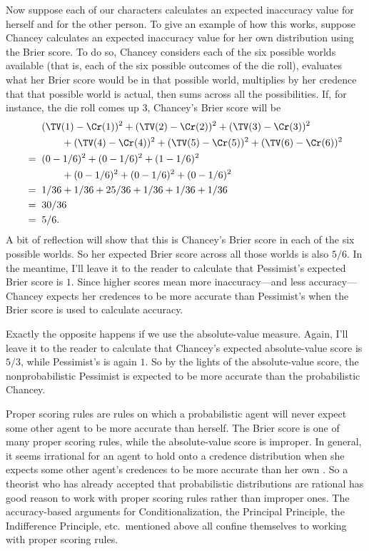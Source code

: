 Now suppose each of our characters calculates an expected inaccuracy value for herself and for the other person. To give an example of how this works, suppose Chancey calculates an expected inaccuracy value for her own distribution using the Brier score. To do so, Chancey considers each of the six possible worlds available (that is, each of the six possible outcomes of the die roll), evaluates what her Brier score would be in that possible world, multiplies by her credence that that possible world is actual, then sums across all the possibilities. If, for instance, the die roll comes up $3$, Chancey's Brier score will be
\begin{equation}
\begin{aligned}
 &\;\;(\TV(1)-\Cr(1))^2 + (\TV(2)-\Cr(2))^2 + (\TV(3)-\Cr(3))^2 \\ 
 &\;\; \qquad + (\TV(4)-\Cr(4))^2 + (\TV(5)-\Cr(5))^2 + (\TV(6)-\Cr(6))^2\\
=&\;\; (0 - 1/6)^2 + (0 - 1/6)^2 + (1 - 1/6)^2\\
 &\;\; \qquad + (0 - 1/6)^2 + (0 - 1/6)^2 + (0 - 1/6)^2\\
=&\;\; 1/36 + 1/36 + 25/36 + 1/36 + 1/36 + 1/36\\
=&\;\; 30/36\\
=&\;\; 5/6.
\end{aligned}
\end{equation}
A bit of reflection will show that this is Chancey's Brier score in each of the six possible worlds. So her expected Brier score across all those worlds is also $5/6$. In the meantime, I'll leave it to the reader to calculate that Pessimist's expected Brier score is $1$. Since higher scores mean more inaccuracy---and less accuracy---Chancey expects her credences to be more accurate than Pessimist's when the Brier score is used to calculate accuracy.

Exactly the opposite happens if we use the absolute-value measure. Again, I'll leave it to the reader to calculate that Chancey's expected absolute-value score is $5/3$, while Pessimist's is again $1$. So by the lights of the absolute-value score, the nonprobabilistic Pessimist is expected to be more accurate than the probabilistic Chancey.

Proper scoring rules are rules on which a probabilistic agent will never expect some other agent to be more accurate than herself. The Brier score is one of many proper scoring rules, while the absolute-value score is improper. In general, it seems irrational for an agent to hold onto a credence distribution when she expects some other agent's credences to be more accurate than her own \citep{LewisImmodest}. So a theorist who has already accepted that probabilistic distributions are rational has good reason to work with proper scoring rules rather than improper ones. The accuracy-based arguments for Conditionalization, the Principal Principle, the Indifference Principle, etc.\ mentioned above all confine themselves to working with proper scoring rules.

